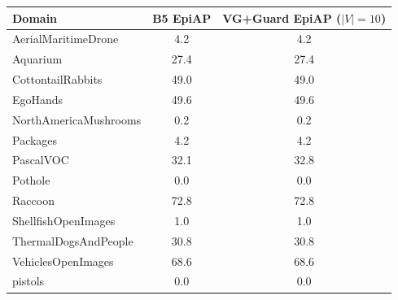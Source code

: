 \begin{tabular}{lcc}
\toprule
Domain & B5 EpiAP & VG+Guard EpiAP ($|V|{=}10$) \\
\midrule
AerialMaritimeDrone & 4.2 & 4.2 \\
Aquarium & 27.4 & 27.4 \\
CottontailRabbits & 49.0 & 49.0 \\
EgoHands & 49.6 & 49.6 \\
NorthAmericaMushrooms & 0.2 & 0.2 \\
Packages & 4.2 & 4.2 \\
PascalVOC & 32.1 & 32.8 \\
Pothole & 0.0 & 0.0 \\
Raccoon & 72.8 & 72.8 \\
ShellfishOpenImages & 1.0 & 1.0 \\
ThermalDogsAndPeople & 30.8 & 30.8 \\
VehiclesOpenImages & 68.6 & 68.6 \\
pistols & 0.0 & 0.0 \\
\bottomrule
\end{tabular}

